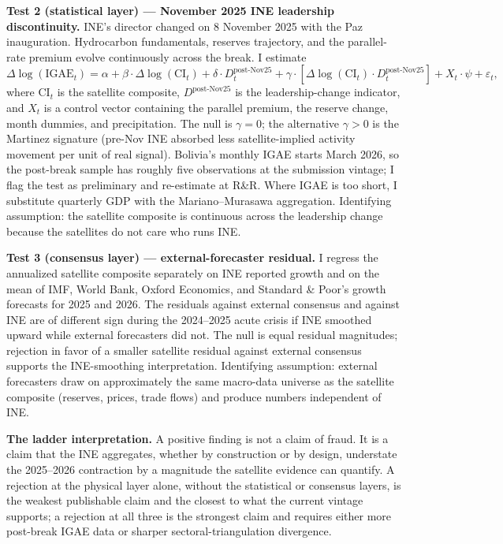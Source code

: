 \documentclass[11pt,letterpaper]{article}
\newcommand{\claim}[1]{\textbf{#1.}}
\begin{document}
\claim{Test 2 (statistical layer) --- November 2025 INE leadership discontinuity} INE's director changed on \num{8} November \num{2025} with the Paz inauguration. Hydrocarbon fundamentals, reserves trajectory, and the parallel-rate premium evolve continuously across the break. I estimate
\begin{equation}
\Delta \log(\text{IGAE}_t) = \alpha + \beta \cdot \Delta \log(\text{CI}_t) + \delta \cdot D^{\text{post-Nov25}}_t + \gamma \cdot [\Delta \log(\text{CI}_t) \cdot D^{\text{post-Nov25}}_t] + X_t \cdot \psi + \varepsilon_t,
\label{eq:leadership_break}
\end{equation}
where CI$_t$ is the satellite composite, $D^{\text{post-Nov25}}$ is the leadership-change indicator, and $X_t$ is a control vector containing the parallel premium, the reserve change, month dummies, and precipitation. The null is $\gamma = 0$; the alternative $\gamma > 0$ is the Martinez signature (pre-Nov INE absorbed less satellite-implied activity movement per unit of real signal). Bolivia's monthly IGAE starts March \num{2026}, so the post-break sample has roughly five observations at the submission vintage; I flag the test as preliminary and re-estimate at R\&R. Where IGAE is too short, I substitute quarterly GDP with the Mariano--Murasawa aggregation. Identifying assumption: the satellite composite is continuous across the leadership change because the satellites do not care who runs INE.

\claim{Test 3 (consensus layer) --- external-forecaster residual} I regress the annualized satellite composite separately on INE reported growth and on the mean of IMF, World Bank, Oxford Economics, and Standard \& Poor's growth forecasts for \num{2025} and \num{2026}. The residuals against external consensus and against INE are of different sign during the 2024--2025 acute crisis if INE smoothed upward while external forecasters did not. The null is equal residual magnitudes; rejection in favor of a smaller satellite residual against external consensus supports the INE-smoothing interpretation. Identifying assumption: external forecasters draw on approximately the same macro-data universe as the satellite composite (reserves, prices, trade flows) and produce numbers independent of INE.

\claim{The ladder interpretation} A positive finding is not a claim of fraud. It is a claim that the INE aggregates, whether by construction or by design, understate the \numrange{2025}{2026} contraction by a magnitude the satellite evidence can quantify. A rejection at the physical layer alone, without the statistical or consensus layers, is the weakest publishable claim and the closest to what the current vintage supports; a rejection at all three is the strongest claim and requires either more post-break IGAE data or sharper sectoral-triangulation divergence.
\end{document}

